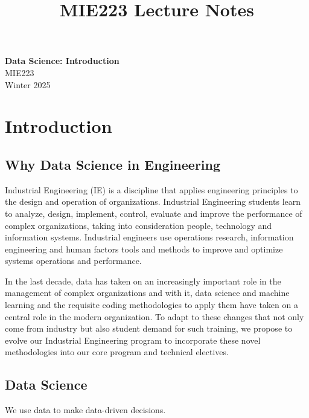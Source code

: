 \documentclass[11pt]{article}
\theoremstyle{definition}
\begin{document}
\setcounter{section}{0}
\title{MIE223 Lecture Notes}

\thispagestyle{empty}

\begin{center}
{\LARGE \bf Data Science: Introduction}\\
{\large MIE223}\\
Winter 2025
\end{center}
\section{Introduction}
\subsection{Why Data Science in Engineering}

Industrial Engineering (IE) is a discipline that applies engineering principles to the design and operation of
organizations. Industrial Engineering students learn to analyze, design, implement, control, evaluate and
improve the performance of complex organizations, taking into consideration people, technology and information
systems. Industrial engineers use operations research, information engineering and human factors tools and
methods to improve and optimize systems operations and performance.

In the last decade, data has taken on an increasingly important role in the management of complex
organizations and with it, data science and machine learning and the requisite coding methodologies to apply
them have taken on a central role in the modern organization. To adapt to these changes that not only come
from industry but also student demand for such training, we propose to evolve our Industrial Engineering program
to incorporate these novel methodologies into our core program and technical electives.

\subsection{Data Science}
We use data to make data-driven decisions.
\end{document}
